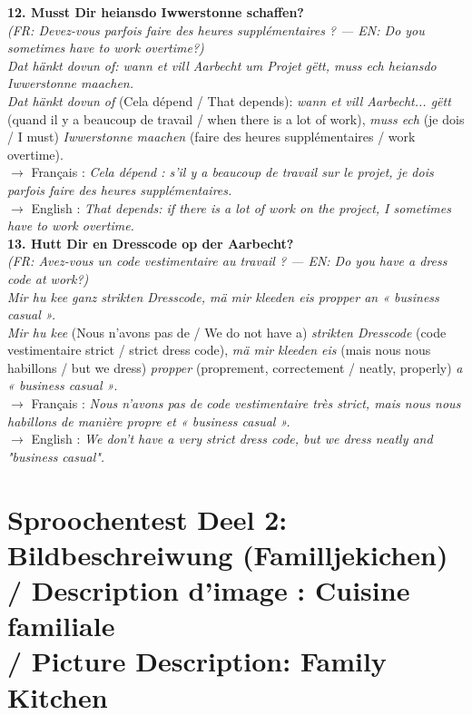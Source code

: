 \noindent\textbf{12. Musst Dir heiansdo Iwwerstonne schaffen?}\\
\textit{(FR: Devez-vous parfois faire des heures supplémentaires ? — EN: Do you sometimes have to work overtime?)}\\[0.3em]
\textit{Dat hänkt dovun of: wann et vill Aarbecht um Projet gëtt, muss ech heiansdo Iwwerstonne maachen.}\\
\textit{Dat hänkt dovun of} (Cela dépend / That depends): \textit{wann et vill Aarbecht... gëtt} (quand il y a beaucoup de travail / when there is a lot of work), \textit{muss ech} (je dois / I must) \textit{Iwwerstonne maachen} (faire des heures supplémentaires / work overtime).\\
$\rightarrow$ Français : \textit{Cela dépend : s'il y a beaucoup de travail sur le projet, je dois parfois faire des heures supplémentaires.}\\
$\rightarrow$ English : \textit{That depends: if there is a lot of work on the project, I sometimes have to work overtime.}\\[0.8em]

\noindent\textbf{13. Hutt Dir en Dresscode op der Aarbecht?}\\
\textit{(FR: Avez-vous un code vestimentaire au travail ? — EN: Do you have a dress code at work?)}\\[0.3em]
\textit{Mir hu kee ganz strikten Dresscode, mä mir kleeden eis propper an « business casual ».}\\
\textit{Mir hu kee} (Nous n'avons pas de / We do not have a) \textit{strikten Dresscode} (code vestimentaire strict / strict dress code), \textit{mä mir kleeden eis} (mais nous nous habillons / but we dress) \textit{propper} (proprement, correctement / neatly, properly) \textit{a « business casual »}.\\
$\rightarrow$ Français : \textit{Nous n'avons pas de code vestimentaire très strict, mais nous nous habillons de manière propre et « business casual ».}\\
$\rightarrow$ English : \textit{We don't have a very strict dress code, but we dress neatly and "business casual".}

\vspace{1.5em}

\section[Sproochentest Deel 2: Bildbeschreiwung (Familljekichen) / Picture Description]{Sproochentest Deel 2: Bildbeschreiwung (Familljekichen) \\/ Description d'image : Cuisine familiale \\/ Picture Description: Family Kitchen}

